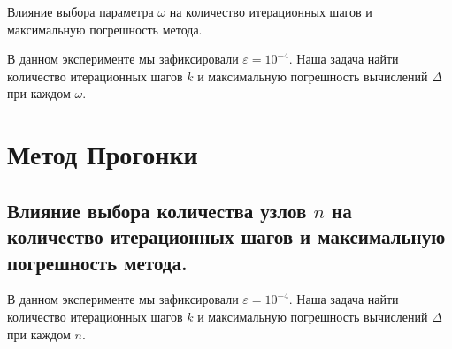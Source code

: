 Влияние выбора параметра $\omega$ на количество итерационных шагов и максимальную погрешность метода.

В данном эксперименте мы зафиксировали $\varepsilon = 10^{-4}$. Наша задача найти количество итерационных шагов $k$ и максимальную погрешность вычислений $\Delta$ при каждом $\omega$.



\chapter{Метод Прогонки}

\section{Влияние выбора количества узлов $n$ на количество итерационных шагов и максимальную погрешность метода.}

В данном эксперименте мы зафиксировали $\varepsilon = 10^{-4}$. Наша задача найти количество итерационных шагов $k$ и максимальную погрешность вычислений $\Delta$ при каждом $n$.

